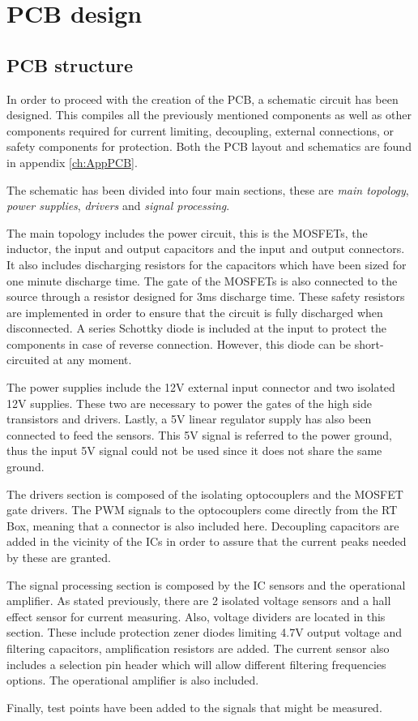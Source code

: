 \section{PCB design}
\subsection{PCB structure} \label{PCB_Schematic}
In order to proceed with the creation of the PCB, a schematic circuit has been designed. This compiles all the previously mentioned components as well as other components required for current limiting, decoupling, external connections, or safety components for protection. Both the PCB layout and schematics are found in appendix \ref{ch:AppPCB}.

The schematic has been divided into four main sections, these are \textit{main topology}, \textit{power supplies}, \textit{drivers} and \textit{signal processing}.

The main topology includes the power circuit, this is the MOSFETs, the inductor, the input and output capacitors and the input and output connectors. It also includes discharging resistors for the capacitors which have been sized for one minute discharge time. The gate of the MOSFETs is also connected to the source through a resistor designed for 3ms discharge time. These safety resistors are implemented in order to ensure that the circuit is fully discharged when disconnected. A series Schottky diode is included at the input to protect the components in case of reverse connection. However, this diode can be short-circuited at any moment.

The power supplies include the 12V external input connector and two isolated 12V supplies. These two are necessary to power the gates of the high side transistors and drivers. Lastly, a 5V linear regulator supply has also been connected to feed the sensors. This 5V signal is referred to the power ground, thus the input 5V signal could not be used since it does not share the same ground.

The drivers section is composed of the isolating optocouplers and the MOSFET gate drivers. The PWM signals to the optocouplers come directly from the RT Box, meaning that a connector is also included here. Decoupling capacitors are added in the vicinity of the ICs in order to assure that the current peaks needed by these are granted.

The signal processing section is composed by the IC sensors and the operational amplifier. As stated previously, there are 2 isolated voltage sensors and a hall effect sensor for current measuring. Also, voltage dividers are located in this section. These include protection zener diodes limiting 4.7V output voltage and filtering capacitors, amplification resistors are added. The current sensor also includes a selection pin header which will allow different filtering frequencies options. The operational amplifier is also included.

Finally, test points have been added to the signals that might be measured.
